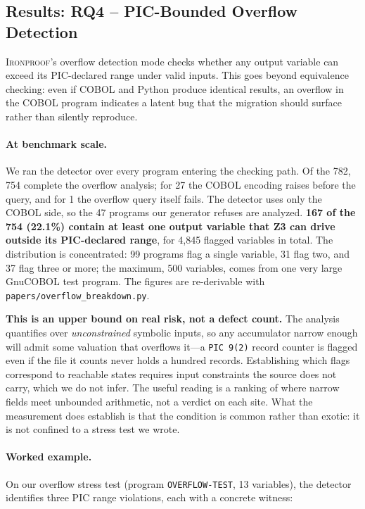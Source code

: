 \documentclass[sigconf,nonacm]{acmart}
\begin{document}
\subsection{Results: RQ4 -- PIC-Bounded Overflow Detection}\label{sec:rq5}

\textsc{Ironproof}'s overflow detection mode checks whether any output variable can exceed its PIC-declared range under valid inputs. This goes beyond equivalence checking: even if COBOL and Python produce identical results, an overflow in the COBOL program indicates a latent bug that the migration should surface rather than silently reproduce.

\paragraph{At benchmark scale.} We ran the detector over every program entering the checking path. Of the 782, 754 complete the overflow analysis; for 27 the COBOL encoding raises before the query, and for 1 the overflow query itself fails. The detector uses only the COBOL side, so the 47 programs our generator refuses are analyzed. \textbf{167 of the 754 (22.1\%) contain at least one output variable that Z3 can drive outside its PIC-declared range}, for 4{,}845 flagged variables in total. The distribution is concentrated: 99 programs flag a single variable, 31 flag two, and 37 flag three or more; the maximum, 500 variables, comes from one very large GnuCOBOL test program. The figures are re-derivable with \texttt{papers/overflow\_breakdown.py}.

\textbf{This is an upper bound on real risk, not a defect count.} The analysis quantifies over \emph{unconstrained} symbolic inputs, so any accumulator narrow enough will admit some valuation that overflows it---a \texttt{PIC 9(2)} record counter is flagged even if the file it counts never holds a hundred records. Establishing which flags correspond to reachable states requires input constraints the source does not carry, which we do not infer. The useful reading is a ranking of where narrow fields meet unbounded arithmetic, not a verdict on each site. What the measurement does establish is that the condition is common rather than exotic: it is not confined to a stress test we wrote.

\paragraph{Worked example.} On our overflow stress test (program \texttt{OVERFLOW-\allowbreak TEST}, 13 variables), the detector identifies three PIC range violations, each with a concrete witness:
\end{document}
